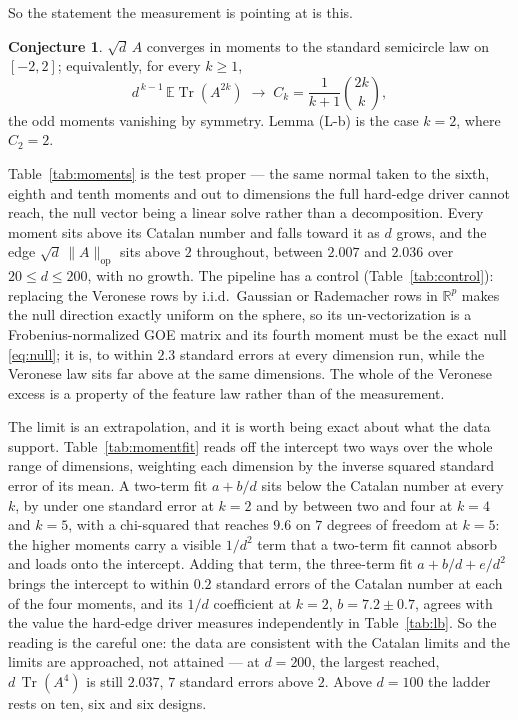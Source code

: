 \documentclass[11pt]{article}
\theoremstyle{definition}
\newtheorem{conjecture}[theorem]{Conjecture}
\DeclareMathOperator{\Tr}{Tr}
\newcommand{\R}{\mathbb{R}}
\newcommand{\E}{\mathbb{E}}
\newcommand{\numControlWorstSe}{2.3}
\newcommand{\numEdgeMax}{2.036}
\newcommand{\numEdgeMin}{2.007}
\newcommand{\numMomChiDof}{7}
\newcommand{\numMomChiTwoLast}{9.6}
\newcommand{\numMomDmax}{200}
\newcommand{\numMomDmin}{20}
\newcommand{\numMomFitB}{7.2}
\newcommand{\numMomFitBse}{0.7}
\newcommand{\numMomFitWorst}{0.2}
\newcommand{\numMomLastMfour}{2.037}
\newcommand{\numMomLastPull}{7}
\begin{document}
So the statement the measurement is pointing at is this.

\begin{conjecture}\label{conj:semicircle}
$\sqrt d\,A$ converges in moments to the standard semicircle law on $[-2,2]$; equivalently, for every
$k\ge1$,
\[
d^{\,k-1}\,\E\Tr(A^{2k})\;\longrightarrow\;C_k=\frac1{k+1}\binom{2k}{k},
\]
the odd moments vanishing by symmetry. Lemma (L-b) is the case $k=2$, where $C_2=2$.
\end{conjecture}

Table~\ref{tab:moments} is the test proper --- the same normal taken to the sixth, eighth and tenth
moments and out to dimensions the full hard-edge driver cannot reach, the null vector being a linear
solve rather than a decomposition. Every moment sits above its Catalan number and falls toward it as
$d$ grows, and the edge $\sqrt d\,\|A\|_{\mathrm{op}}$ sits above $2$ throughout, between
$\numEdgeMin$ and $\numEdgeMax$ over $\numMomDmin\le d\le\numMomDmax$, with no growth. The pipeline
has a control (Table~\ref{tab:control}): replacing the Veronese rows by i.i.d.\ Gaussian or
Rademacher rows in $\R^p$ makes the null direction exactly uniform on the sphere, so its
un-vectorization is a Frobenius-normalized GOE matrix and its fourth moment must be the exact null
\eqref{eq:null}; it is, to within $\numControlWorstSe$ standard errors at every dimension run, while
the Veronese law
sits far above at the same dimensions. The whole of the Veronese excess is a property of the feature
law rather than of the measurement.

The limit is an extrapolation, and it is worth being exact about what the data support.
Table~\ref{tab:momentfit} reads off the intercept two ways over the whole range of dimensions,
weighting each dimension by the inverse squared standard error of its mean. A two-term fit $a+b/d$
sits below the Catalan number at every $k$, by under one standard error at $k=2$ and by between
two and four at $k=4$ and $k=5$, with a chi-squared that reaches $\numMomChiTwoLast$ on
$\numMomChiDof$ degrees of freedom at $k=5$: the higher moments carry a visible $1/d^2$ term that a
two-term fit cannot absorb and loads onto the intercept. Adding that term, the three-term fit
$a+b/d+e/d^2$ brings the intercept to within $\numMomFitWorst$ standard errors of the Catalan number
at each of the four moments, and its $1/d$ coefficient at $k=2$, $b=\numMomFitB\pm\numMomFitBse$,
agrees with the value the hard-edge driver measures independently in Table~\ref{tab:lb}. So the
reading is the careful one: the data are consistent with the Catalan limits and the limits are
approached, not attained --- at $d=\numMomDmax$, the largest reached, $d\,\Tr(A^4)$ is still
$\numMomLastMfour$, $\numMomLastPull$ standard errors above $2$. Above $d=100$ the ladder rests on
ten, six and six designs.
\end{document}
